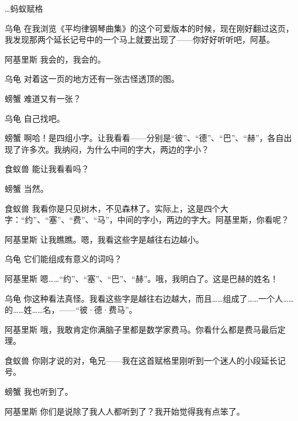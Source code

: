 \begin{dialog}{…蚂蚁赋格}
\begin{dialogue}
\item[乌龟]在我浏览《平均律钢琴曲集》的这个可爱版本的时候，现在刚好翻过这页，我发现那两个延长记号中的一个马上就要出现了——你好好听听吧，阿基。

\item[阿基里斯]我会的，我会的。

\item[乌龟]对着这一页的地方还有一张古怪透顶的图。

\item[螃蟹]难道又有一张？

\item[乌龟]自己找吧。

\item[螃蟹]啊哈！是四组小字。让我看看——分别是“彼”、“德”、“巴”、“赫”，各自出现了许多次。我纳闷，为什么中间的字大，两边的字小？

\item[食蚁兽]能让我看看吗？

\item[螃蟹]当然。

\item[食蚁兽]我看你是只见树木，不见森林了。实际上，这是四个大字：“约”、“塞”、“费”、“马”，中间的字小，两边的字大。阿基里斯，你看呢？

\item[阿基里斯]让我瞧瞧。嗯，我看这些字是越往右边越小。

\item[乌龟]它们能组成有意义的词吗？

\item[阿基里斯]嗯……“约”、“塞”、“巴”、“赫”。哦，我明白了。这是巴赫的姓名！

\item[乌龟]你这种看法真怪。我看这些字是越往右边越大，而且……组成了……一个人……的……姓……名，——“彼·德·费马”。

\item[阿基里斯]哦，我敢肯定你满脑子里都是数学家费马。你看什么都是费马最后定理。

\item[食蚁兽]你刚才说的对，龟兄——我在这首赋格里刚听到一个迷人的小段延长记号。

\item[螃蟹]我也听到了。

\item[阿基里斯]你们是说除了我人人都听到了？我开始觉得我有点笨了。


\end{dialogue}
\end{dialog}

